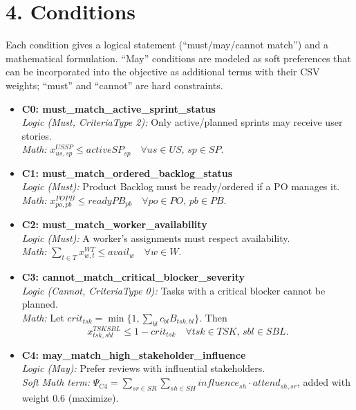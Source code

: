 \documentclass[11pt,a4paper]{article}
\begin{document}
\section{4. Conditions}
Each condition gives a logical statement (``must/may/cannot match'') and a mathematical formulation. ``May'' conditions are modeled as soft preferences that can be incorporated into the objective as additional terms with their CSV weights; ``must'' and ``cannot'' are hard constraints.

\begin{itemize}[leftmargin=2.2em]

  \item \textbf{C0: must\_match\_active\_sprint\_status} \\
  \emph{Logic (Must, CriteriaType 2):} Only active/planned sprints may receive user stories. \\
  \emph{Math:} $\displaystyle x^{USSP}_{us,sp} \le activeSP_{sp}\quad \forall us\in US,\, sp\in SP.$

  \item \textbf{C1: must\_match\_ordered\_backlog\_status} \\
  \emph{Logic (Must):} Product Backlog must be ready/ordered if a PO manages it. \\
  \emph{Math:} $\displaystyle x^{POPB}_{po,pb} \le readyPB_{pb}\quad \forall po\in PO,\, pb\in PB.$

  \item \textbf{C2: must\_match\_worker\_availability} \\
  \emph{Logic (Must):} A worker's assignments must respect availability. \\
  \emph{Math:} $\displaystyle \sum_{t\in T} x^{WT}_{w,t} \le avail_{w}\quad \forall w\in W.$

  \item \textbf{C3: cannot\_match\_critical\_blocker\_severity} \\
  \emph{Logic (Cannot, CriteriaType 0):} Tasks with a critical blocker cannot be planned. \\
  \emph{Math:} Let $crit_{tsk}=\min\{1,\sum_{bl} c_{bl}B_{tsk,bl}\}$. Then
  \[
  x^{TSKSBL}_{tsk,sbl} \le 1-crit_{tsk}\quad \forall tsk\in TSK,\, sbl\in SBL.
  \]

  \item \textbf{C4: may\_match\_high\_stakeholder\_influence} \\
  \emph{Logic (May):} Prefer reviews with influential stakeholders. \\
  \emph{Soft Math term:} $\displaystyle \Psi_{C4}=\sum_{sr\in SR}\sum_{sh\in SH} influence_{sh}\cdot attend_{sh,sr}$, added with weight $0.6$ (maximize).


\end{itemize}
\end{document}
